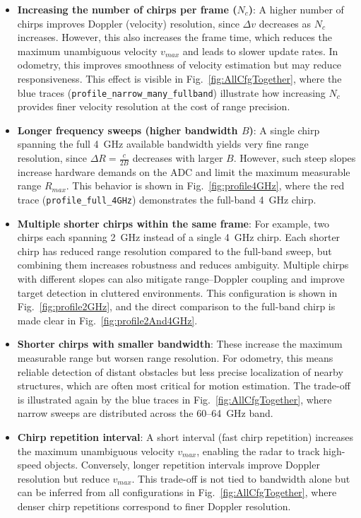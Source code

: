 \begin{itemize}
    \item \textbf{Increasing the number of chirps per frame ($N_c$)}:  
    A higher number of chirps improves Doppler (velocity) resolution, since $\Delta v$ decreases as $N_c$ increases.  
    However, this also increases the frame time, which reduces the maximum unambiguous velocity $v_{max}$ and leads to slower update rates.  
    In odometry, this improves smoothness of velocity estimation but may reduce responsiveness.  
    This effect is visible in Fig.~\ref{fig:AllCfgTogether}, where the blue traces (\texttt{profile\_narrow\_many\_fullband}) illustrate how increasing $N_c$ provides finer velocity resolution at the cost of range precision.

    \item \textbf{Longer frequency sweeps (higher bandwidth $B$)}:  
    A single chirp spanning the full 4~GHz available bandwidth yields very fine range resolution, since $\Delta R = \tfrac{c}{2B}$ decreases with larger $B$.  
    However, such steep slopes increase hardware demands on the ADC and limit the maximum measurable range $R_{max}$.  
    This behavior is shown in Fig.~\ref{fig:profile4GHz}, where the red trace (\texttt{profile\_full\_4GHz}) demonstrates the full-band 4~GHz chirp.

    \item \textbf{Multiple shorter chirps within the same frame}:  
    For example, two chirps each spanning 2~GHz instead of a single 4~GHz chirp.  
    Each shorter chirp has reduced range resolution compared to the full-band sweep, but combining them increases robustness and reduces ambiguity.  
    Multiple chirps with different slopes can also mitigate range–Doppler coupling and improve target detection in cluttered environments.  
    This configuration is shown in Fig.~\ref{fig:profile2GHz}, and the direct comparison to the full-band chirp is made clear in Fig.~\ref{fig:profile2And4GHz}.

    \item \textbf{Shorter chirps with smaller bandwidth}:  
    These increase the maximum measurable range but worsen range resolution.  
    For odometry, this means reliable detection of distant obstacles but less precise localization of nearby structures, which are often most critical for motion estimation.  
    The trade-off is illustrated again by the blue traces in Fig.~\ref{fig:AllCfgTogether}, where narrow sweeps are distributed across the 60–64~GHz band.

    \item \textbf{Chirp repetition interval}:  
    A short interval (fast chirp repetition) increases the maximum unambiguous velocity $v_{max}$, enabling the radar to track high-speed objects.  
    Conversely, longer repetition intervals improve Doppler resolution but reduce $v_{max}$.  
    This trade-off is not tied to bandwidth alone but can be inferred from all configurations in Fig.~\ref{fig:AllCfgTogether}, where denser chirp repetitions correspond to finer Doppler resolution.
\end{itemize}


